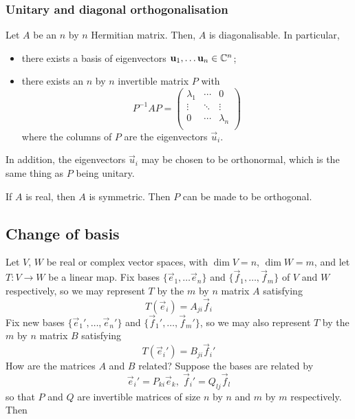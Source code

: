 \documentclass{../template/note}
\begin{document}
    \subsubsection{Unitary and diagonal orthogonalisation}

    \begin{theorem}
        Let \(A\) be an \(n\) by \(n\) Hermitian matrix. Then, \(A\) is diagonalisable. In particular,
        \begin{itemize}
            \item there exists a basis of eigenvectors \(\vec u_1, \dots \vec u_n \in \CC^n\);
            \item there exists an \(n\) by \(n\) invertible matrix \(P\) with
            \[
                P^{-1}AP = \begin{pmatrix}
                 \lambda_1 & \cdots & 0 \\
                 \vdots & \ddots & \vdots \\
                 0 & \cdots & \lambda_n \\
                \end{pmatrix}
            \]
            where the columns of \(P\) are the eigenvectors \(\vec u_i\).
        \end{itemize}
    \end{theorem}
    
    \begin{remark*}
        In addition, the eigenvectors \(\vec u_i\) may be chosen to be orthonormal, which is the same thing as \(P\) being unitary.
    \end{remark*}
    
    \begin{remark*}
        If \(A\) is real, then \(A\) is symmetric. Then \(P\) can be made to be orthogonal.
    \end{remark*}
    
    \subsection{Change of basis}

    Let \(V\), \(W\) be real or complex vector spaces, with \(\dim V = n\), \(\dim W = m\), and let \(T: V \to W\) be a linear map. Fix bases \(\{\vec e_1, \dots \vec e_n\}\) and \(\{\vec f_1, \dots, \vec f_m\}\) of \(V\) and \(W\) respectively, so we may represent \(T\) by the \(m\) by \(n\) matrix \(A\) satisfying
    \[
        T(\vec e_i) = A_{ji} \vec f_i
    \]
    Fix new bases \(\{\vec e_1', \dots, \vec e_n'\}\) and \(\{\vec f_1', \dots, \vec f_m'\}\), so we may also represent \(T\) by the \(m\) by \(n\) matrix \(B\) satisfying
    \[
        T(\vec e_i') = B_{ji} \vec f_i'
    \]
    How are the matrices \(A\) and \(B\) related? Suppose the bases are related by
    \[
        \vec e_i' = P_{ki}\vec e_k, \; \vec f_i' = Q_{lj} \vec f_l
    \]
    so that \(P\) and \(Q\) are invertible matrices of size \(n\) by \(n\) and \(m\) by \(m\) respectively. Then
\end{document}
